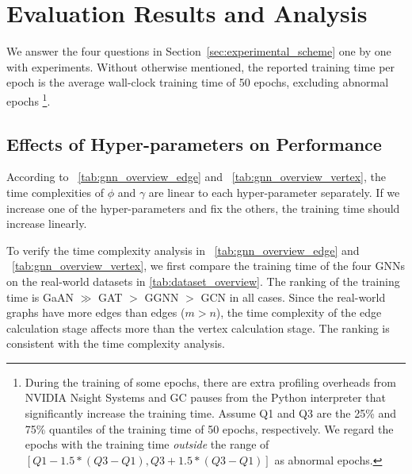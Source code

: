 \section{Evaluation Results and Analysis}
\label{sec:experiment_results}

We answer the four questions in Section~\ref{sec:experimental_scheme} one by one with experiments.
Without otherwise mentioned, the reported training time per epoch is the average wall-clock training time of 50 epochs, excluding abnormal epochs \footnote{During the training of some epochs, there are extra profiling overheads from NVIDIA Nsight Systems and GC pauses from the Python interpreter that significantly increase the training time. Assume Q1 and Q3 are the 25\% and 75\% quantiles of the training time of 50 epochs, respectively. We regard the epochs with the training time \emph{outside} the range of $[Q1 - 1.5 * (Q3-Q1), Q3 + 1.5 * (Q3-Q1)]$ as abnormal epochs.}.

\subsection{Effects of Hyper-parameters on Performance}
\label{sec:effects_of_hyper-parameters_on_performance}

According to \tablename~\ref{tab:gnn_overview_edge} and \tablename~\ref{tab:gnn_overview_vertex}, the time complexities of $\phi$ and $\gamma$ are linear to each hyper-parameter separately.
If we increase one of the hyper-parameters and fix the others, the training time should increase linearly.

To verify the time complexity analysis in \tablename~\ref{tab:gnn_overview_edge} and \tablename~\ref{tab:gnn_overview_vertex}, we first compare the training time of the four GNNs on the real-world datasets in \ref{tab:dataset_overview}.
The ranking of the training time is GaAN $\gg$ GAT $>$ GGNN $>$ GCN in all cases.
Since the real-world graphs have more edges than edges ($m > n$), the time complexity of the edge calculation stage affects more than the vertex calculation stage.
The ranking is consistent with the time complexity analysis.

